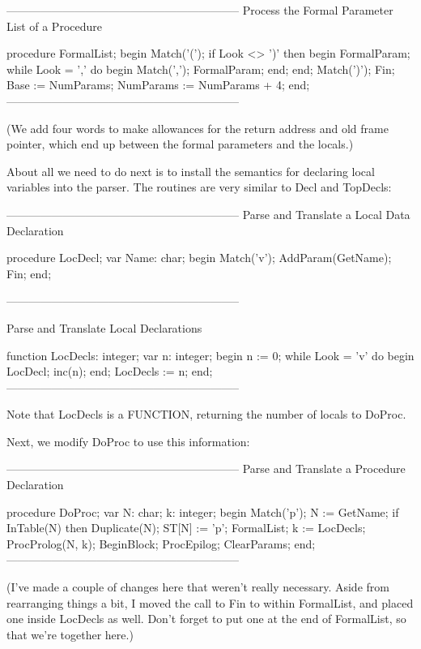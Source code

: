 \documentclass[float=false, crop=false]{standalone}
\begin{document}
{--------------------------------------------------------------}
{ Process the Formal Parameter List of a Procedure }

procedure FormalList;
begin
     Match('(');
     if Look <> ')' then begin
          FormalParam;
          while Look = ',' do begin
               Match(',');
               FormalParam;
          end;
     end;
     Match(')');
     Fin;
     Base := NumParams;
     NumParams := NumParams + 4;
end;
{--------------------------------------------------------------}


(We add four words to make allowances for the return address and old frame
pointer, which end up between the formal parameters and the locals.)

About all we need to do next is to install the semantics for declaring local
variables into the parser. The routines are very similar to Decl and TopDecls:


{--------------------------------------------------------------}
{ Parse and Translate a Local Data Declaration }

procedure LocDecl;
var Name: char;
begin
   Match('v');
     AddParam(GetName);
     Fin;
end;


{--------------------------------------------------------------}


{ Parse and Translate Local Declarations }

function LocDecls: integer;
var n: integer;
begin
     n := 0;
     while Look = 'v' do begin
          LocDecl;
          inc(n);
     end;
     LocDecls := n;
end;
{--------------------------------------------------------------}


Note that LocDecls is a FUNCTION, returning the number of locals to DoProc.

Next, we modify DoProc to use this information:


{--------------------------------------------------------------}
{ Parse and Translate a Procedure Declaration }

procedure DoProc;
var N: char;
      k: integer;
begin
     Match('p');
     N := GetName;
     if InTable(N) then Duplicate(N);
     ST[N] := 'p';
     FormalList;
     k := LocDecls;
     ProcProlog(N, k);
     BeginBlock;
     ProcEpilog;
     ClearParams;
end;
{--------------------------------------------------------------}


(I've made a couple of changes here that weren't really necessary. Aside from
rearranging things a bit, I moved the call to Fin to within FormalList, and
placed one inside LocDecls as well. Don't forget to put one at the end of
FormalList, so that we're together here.)
\end{document}
